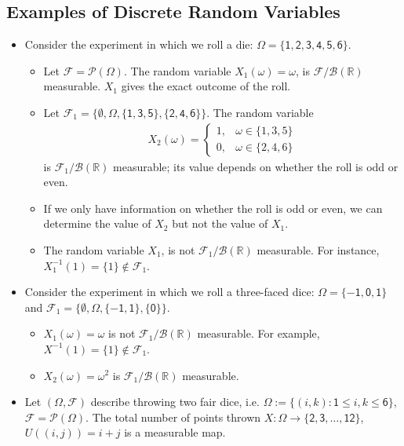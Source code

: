 \documentclass{tufte-handout}
\begin{document}
\subsection{Examples of Discrete Random Variables}
\begin{itemize}
\item Consider the experiment in which we roll a die: $\Omega=\mathsf{\{1,2,3,4,5,6\}}$.
\begin{itemize}
\item Let $\mathscr F= \mathscr P(\Omega)$. The random variable $X_1(\omega) = \omega$, is $\mathscr F/\mathcal B(\mathbb R)$ measurable. $X_1$ gives the exact outcome of the roll.
\item Let $\mathscr F_1= \{\emptyset,\Omega, \mathsf{\{1,3,5\},\{2,4,6\}\}}$. The random variable
\begin{align*}
X_2(\omega) = 
\begin{cases}
 1, & \omega \in\{1,3,5\}\\
 0, & \omega \in\{2,4,6\}
\end{cases}				
\end{align*}
is $\mathscr F_1\mathcal / \mathcal B(\mathbb R)$ measurable; its value depends on whether the roll is odd or even.
\item If we only have information on whether the roll is odd or even, we can determine the value of $X_2$ but not the value of $X_1$.
\item The random variable $X_1$, is  not  $\mathscr F_{1}/\mathcal B(\mathbb R)$ measurable. For instance, $X_{1}^{-1}(1) = \{1\} \notin \mathscr F_{1}$.
\end{itemize}
\item Consider the experiment in which we roll a three-faced dice: $\Omega=\mathsf{\{-1,0,1\}}$ and  $\mathscr F_1= \{\emptyset,\Omega, \mathsf{\{-1,1\},\{0\}\}}$.
\begin{itemize}
\item $X_1(\omega)=\omega$ is not $\mathscr F_{1}/\mathcal B(\mathbb R)$ measurable. For example, $X^{-1}(1) = \{1\} \notin \mathscr F_{1}$.
\item $X_2(\omega)=\omega^2$ is $\mathscr F_{1}/\mathcal B(\mathbb R)$ measurable.
\end{itemize} 
\item Let $(\Omega,\mathscr F)$ describe throwing two fair dice, i.e. $\Omega:= \{(i,k): \mathsf 1\leq i,k\leq \mathsf 6\}$, $\mathscr F = \mathscr P (\Omega)$. The total number of points thrown $X: \Omega \rightarrow \mathsf{\{2,3,\dots, 12\}}$, $U((i,j))=i+j$ is a measurable map.

\end{itemize}
\end{document}

